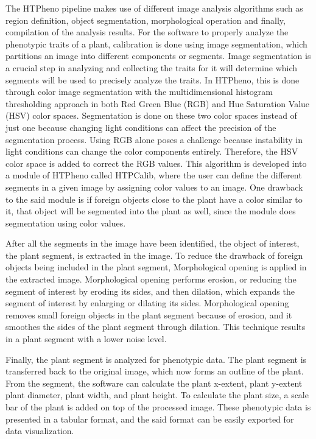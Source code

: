 The HTPheno pipeline makes use of different image analysis algorithms such as region definition, object segmentation, morphological operation and finally, compilation of the analysis results.
For the software to properly analyze the phenotypic traits of a plant, calibration is done using image segmentation, which partitions an image into different components or segments. Image segmentation is a crucial step in analyzing and collecting the traits for it will determine which segments will be used to precisely analyze the traits. In HTPheno, this is done through color image segmentation with the multidimensional histogram thresholding approach in both Red Green Blue (RGB) and Hue Saturation Value (HSV) color spaces. Segmentation is done on these two color spaces instead of just one because changing light conditions can affect the precision of the segmentation process. Using RGB alone poses a challenge because instability in light conditions can change the color components entirely. Therefore, the HSV color space is added to correct the RGB values. This algorithm is developed into a module of HTPheno called HTPCalib, where the user can define the different segments in a given image by assigning color values to an image. One drawback to the said module is if foreign objects close to the plant have a color similar to it, that object will be segmented into the plant as well, since the module does segmentation using color values.
 
After all the segments in the image have been identified, the object of interest, the plant segment, is extracted in the image. To reduce the drawback of foreign objects being included in the plant segment, Morphological opening is applied in the extracted image. Morphological opening performs erosion, or reducing the segment of interest by eroding its sides, and then dilation, which expands the segment of interest by enlarging or dilating its sides. Morphological opening removes small foreign objects in the plant segment because of erosion, and it smoothes the sides of the plant segment through dilation. This technique results in a plant segment with a lower noise level.

 Finally, the plant segment is analyzed for phenotypic data. The plant segment is transferred back to the original image, which now forms an outline of the plant. From the segment, the software can calculate the plant x-extent, plant y-extent plant diameter, plant width, and plant height. To calculate the plant size, a scale bar of the plant is added on top of the processed image. These phenotypic data is presented in a tabular format, and the said format can be easily exported for data visualization.

